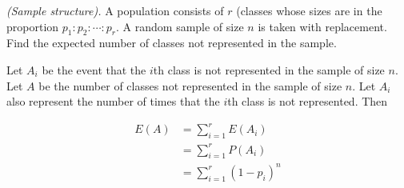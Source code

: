 \begin{problem}[Handout 6, \# 13]
  \emph{(Sample structure).} A population consists of \(r\) (classes whose
  sizes are in the proportion \(p_1:p_2:\dotsb:p_r\). A random sample of
  size \(n\) is taken with replacement. Find the expected number of classes
  not represented in the sample.
\end{problem}
\begin{solution}
Let $A_i$ be the event that the $i$th class is not represented in the sample of size $n$. Let $A$ be the number of classes not represented in the sample of size $n$. Let $A_i$ also represent the number of times that the $i$th class is not represented. Then

\begin{align*}
E(A) &= \sum\limits_{i=1}^r E(A_i) \\
&= \sum\limits_{i=1}^r P(A_i) \\
&= \sum\limits_{i=1}^r (1-p_i)^n \\
\end{align*}
\end{solution}

